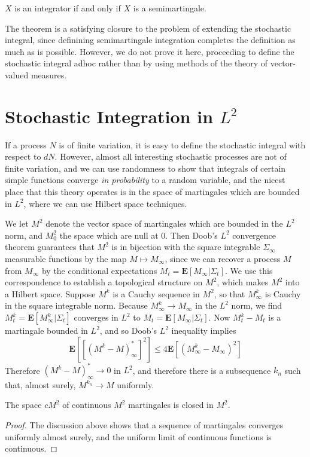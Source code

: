 \begin{theorem}
    $X$ is an integrator if and only if $X$ is a semimartingale.
\end{theorem}

The theorem is a satisfying closure to the problem of extending the stochastic integral, since definining semimartingale integration completes the definition as much as is possible. However, we do not prove it here, proceeding to define the stochastic integral adhoc rather than by using methods of the theory of vector-valued measures.

\section{Stochastic Integration in $L^2$}

If a process $N$ is of finite variation, it is easy to define the stochastic integral with respect to $dN$. However, almost all interesting stochastic processes are not of finite variation, and we can use randomness to show that integrals of certain simple functions converge {\it in probability} to a random variable, and the nicest place that this theory operates is in the space of martingales which are bounded in $L^2$, where we can use Hilbert space techniques.

We let $M^2$ denote the vector space of martingales which are bounded in the $L^2$ norm, and $M^2_0$ the space which are null at 0. Then Doob's $L^2$ convergence theorem guarantees that $M^2$ is in bijection with the square integrable $\Sigma_\infty$ measurable functions by the map $M \mapsto M_\infty$, since we can recover a process $M$ from $M_\infty$ by the conditional expectations $M_t = \mathbf{E}[M_\infty|\Sigma_t]$. We use this correspondence to establish a topological structure on $M^2$, which makes $M^2$ into a Hilbert space. Suppose $M^k$ is a Cauchy sequence in $M^2$, so that $M^k_\infty$ is Cauchy in the square integrable norm. Because $M^k_\infty \to M_\infty$ in the $L^2$ norm, we find $M^k_t = \mathbf{E}[M^k_\infty|\Sigma_t]$ converges in $L^2$ to $M_t = \mathbf{E}[M_\infty|\Sigma_t]$. Now $M^k_t - M_t$ is a martingale bounded in $L^2$, and so Doob's $L^2$ inequality implies
%
\[ \mathbf{E}[[(M^k - M)^*_\infty]^2] \leq 4 \mathbf{E}[(M^k_\infty - M_\infty)^2] \]
%
Therefore $(M^k - M)^*_\infty \to 0$ in $L^2$, and therefore there is a subsequence $k_n$ such that, almost surely, $M^{k_n} \to M$ uniformly.

\begin{lemma}
    The space $cM^2$ of continuous $M^2$ martingales is closed in $M^2$.
\end{lemma}
\begin{proof}
    The discussion above shows that a sequence of martingales converges uniformly almost surely, and the uniform limit of continuous functions is continuous.
\end{proof}

